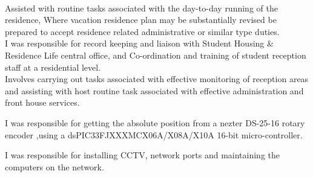 \documentclass[]{deedy-resume-openfont}
\begin{document}
\begin{minipage}[t]{0.66\textwidth}
\\
Assisted with routine tasks associated with the day-to-day running of the residence, Where vacation residence plan may be substantially revised be prepared to accept residence related administrative or similar type duties.
\sectionsep
\\
I was responsible for record keeping and liaison with Student Housing $\&$ Residence Life central office, and Co-ordination and training of student reception staff at a residential level.
\sectionsep
\\
Involves carrying out tasks associated with effective monitoring of reception areas and assisting with host routine task associated with effective administration and front house services.
\sectionsep

I was responsible for getting the absolute position from a nezter DS-25-16 rotary encoder ,using a dsPIC33FJXXXMCX06A/X08A/X10A 16-bit micro-controller.
\sectionsep

I was responsible for installing CCTV, network ports and maintaining the computers on the network.

\end{minipage} 

\newpage
\end{document}
